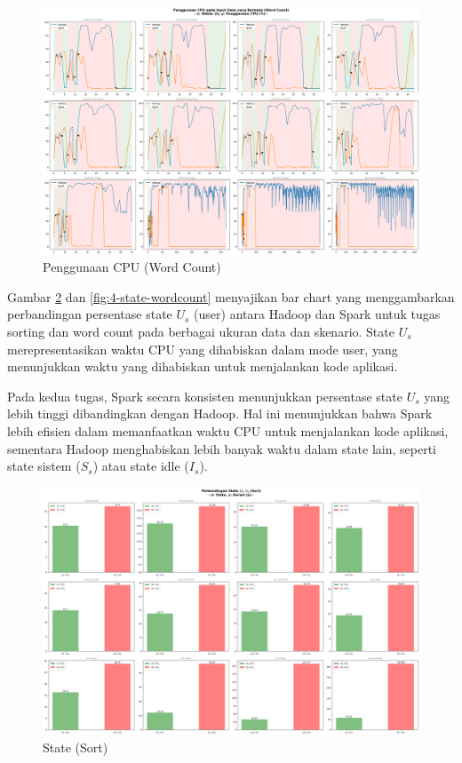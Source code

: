 \begin{figure}[h]
    \centering
    \includegraphics[width=1\textwidth]{figures/ch04/4-penggunaan-cpu-all-wordcount.png}
    \caption{Penggunaan CPU (Word Count)}
    \label{fig:4-penggunaan-cpu-all-wordcount}
\end{figure}

Gambar \ref{fig:4-state-sort} dan \ref{fig:4-state-wordcount} menyajikan bar chart yang menggambarkan perbandingan persentase state $U_s$ (user) antara Hadoop dan Spark untuk tugas sorting dan word count pada berbagai ukuran data dan skenario. State $U_s$ merepresentasikan waktu CPU yang dihabiskan dalam mode user, yang menunjukkan waktu yang dihabiskan untuk menjalankan kode aplikasi. 

Pada kedua tugas, Spark secara konsisten menunjukkan persentase state $U_s$ yang lebih tinggi dibandingkan dengan Hadoop. Hal ini menunjukkan bahwa Spark lebih efisien dalam memanfaatkan waktu CPU untuk menjalankan kode aplikasi, sementara Hadoop menghabiskan lebih banyak waktu dalam state lain, seperti state sistem ($S_s$) atau state idle ($I_s$). 

\begin{figure}[h]
    \centering
    \includegraphics[width=1\textwidth]{figures/ch04/4-state-sort.png}
    \caption{State (Sort)}
    \label{fig:4-state-sort}
\end{figure}

